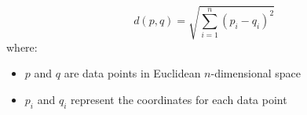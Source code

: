 \documentclass[preview]{standalone}
\begin{document}
{\large
\[
d(p,q)=\sqrt{\sum^n_{i=1}(p_i-q_i)^2}
\]
}
where:
\begin{itemize}
	\setlength\itemsep{0.1em}
	\item $p$ and $q$ are data points in Euclidean $n$-dimensional space
	\item $p_i$ and $q_i$ represent the coordinates for each data point
\end{itemize}
\end{document}
